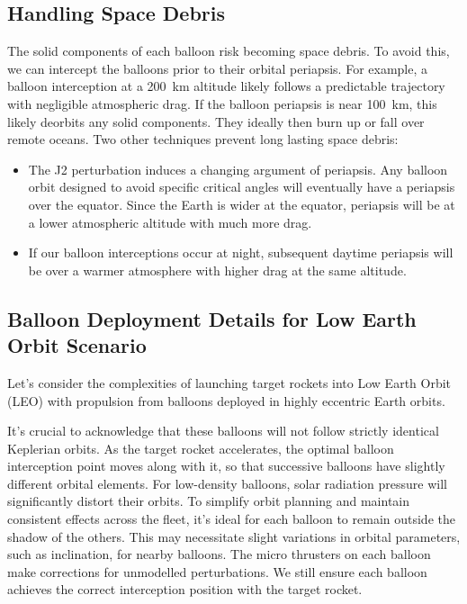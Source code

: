 \documentclass{article}
\begin{document}
{\subsection{Handling Space Debris}
The solid components of each balloon risk becoming space debris. To avoid this, we can intercept the balloons prior to their orbital periapsis.  For example, a balloon interception at a \SI{200}{\kilo\meter} altitude likely follows a predictable trajectory with negligible atmospheric drag.   If the balloon periapsis is near \SI{100}{\kilo\meter}, this likely deorbits any solid components.   They ideally then burn up or fall over remote oceans.   Two other techniques prevent long lasting space debris:

\begin{itemize}
\item The J2 perturbation induces a changing argument of periapsis. Any balloon orbit designed to avoid specific critical angles will eventually have a periapsis over the equator.  Since the Earth is wider at the equator, periapsis will be at a lower atmospheric altitude with much more drag.
\item If our balloon interceptions occur at night, subsequent daytime periapsis will be over a warmer atmosphere with higher drag at the same altitude.
\end{itemize}

\subsection{Balloon Deployment Details for Low Earth Orbit Scenario}
Let's consider the complexities of launching target rockets into Low Earth Orbit (LEO) with propulsion from balloons deployed in highly eccentric Earth orbits.

It's crucial to acknowledge that these balloons will not follow strictly identical Keplerian orbits. As the target rocket accelerates, the optimal balloon interception point moves along with it, so that successive balloons have slightly different orbital elements.
For low-density balloons, solar radiation pressure will significantly distort their orbits. To simplify orbit planning and maintain consistent  effects across the fleet, it's ideal for each balloon to remain outside the shadow of the others. This may necessitate slight variations in orbital parameters, such as inclination, for nearby balloons. The micro thrusters on each balloon  make corrections for unmodelled perturbations.  We still ensure each balloon achieves the correct interception position with the target rocket.   

}
\end{document}
